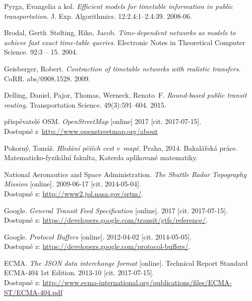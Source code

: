 \begin{raggedright}
\begin{thebibliography}{10}


	{\sc Pyrga}, Evangelia a kol.
	\emph{Efficient models for timetable information in public
	transportation}.
	J. Exp. Algorithmics. 12:2.4:1--2.4:39. 2008-06.

	{\sc Brodal}, Gerth~Stølting, {\sc Riko}, Jacob.
	\emph{Time-dependent networks as models to achieve fast exact
	time-table queries}. 
	Electronic Notes in Theoretical Computer Science.
	92:3 -- 15. 2004.

	{\sc Geisberger}, Robert.
	\emph{Contraction of timetable networks with realistic transfers}.
	CoRR.
	abs/0908.1528. 2009.

	{\sc Delling}, Daniel, {\sc Pajor}, Thomas, {\sc Werneck}, Renato~F.
	\emph{Round-based public transit routing.}
	Transportation Science.
	49(3):591--604. 2015.

	přispěvatelé OSM.
	\emph{OpenStreetMap} [online]
	2017 [cit. 2017-07-15].\\
	Dostupné z~\url{http://www.openstreetmap.org/about}

	{\sc Pokorný}, Tomáš.
	\emph{Hledání pěších cest v~mapě}.
	Praha, 
	2014.
	Bakalářská práce. Matematicko-fyzikální fakulta, Katerda aplikované
	matematiky.

	{\sc National Aeronautics and Space Administration.}
	\emph{The Shuttle Radar Topography Mission} [online]. 
	2009-06-17 [cit. 2014-05-04]. \\
	Dostupné z: \url{http://www2.jpl.nasa.gov/srtm/}.

	{\sc Google.}
	\emph{General Transit Feed Specification} [online]. 
	2017 [cit. 2017-07-15]. \\
	Dostupné z: \url{https://developers.google.com/transit/gtfs/reference/}.

	{\sc Google.}
	\emph{Protocol Buffers} [online]. 
	2012-04-02 [cit. 2014-05-05]. \\
	Dostupné z: \url{https://developers.google.com/protocol-buffers/}.

	{\sc ECMA}.
	\emph{The {JSON} data interchange format} [online].
	Technical Report Standard ECMA-404 1st Edition.
	2013-10 [cit. 2017-07-15].\\
	Dostupné z:
	\url{http://www.ecma-international.org/publications/files/ECMA-ST/ECMA-404.pdf}


\end{thebibliography}
\end{raggedright}
